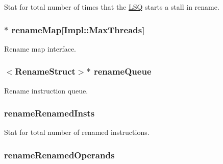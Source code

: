 \label{classDefaultRename_aba431e021496d1070a1d8f9ad7ec71f2}
Stat for total number of times that the \hyperlink{classLSQ}{LSQ} starts a stall in rename. \hypertarget{classDefaultRename_ac305c101c17d28451cc1f023b187b08b}{
\subsubsection[{renameMap}]{$\ast$ {\bf renameMap}\mbox{[}Impl::MaxThreads\mbox{]}}}
\label{classDefaultRename_ac305c101c17d28451cc1f023b187b08b}
Rename map interface. \hypertarget{classDefaultRename_ae9b536282159ba75153a223be77515ba}{
\subsubsection[{renameQueue}]{$<${\bf RenameStruct}$>$$\ast$ {\bf renameQueue}}}
\label{classDefaultRename_ae9b536282159ba75153a223be77515ba}
Rename instruction queue. \hypertarget{classDefaultRename_aee6bb4587ea6f254fc29dda4d565afc9}{
\subsubsection[{renameRenamedInsts}]{ {\bf renameRenamedInsts}}}
\label{classDefaultRename_aee6bb4587ea6f254fc29dda4d565afc9}
Stat for total number of renamed instructions. \hypertarget{classDefaultRename_a3e2c435288350f7d805557b4d1a2b7a5}{
\subsubsection[{renameRenamedOperands}]{ {\bf renameRenamedOperands}}}
